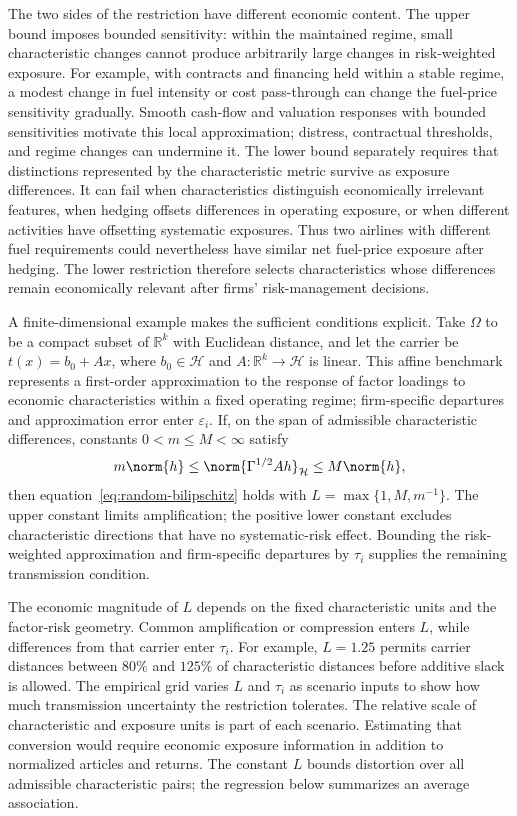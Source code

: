 The two sides of the restriction have different economic content.
The upper bound imposes bounded sensitivity: within the maintained regime,
small characteristic changes cannot produce arbitrarily large changes in
risk-weighted exposure.
For example, with contracts and financing held within a stable regime,
a modest change in fuel intensity or cost pass-through can change the
fuel-price sensitivity gradually.
Smooth cash-flow and valuation responses with bounded sensitivities motivate
this local approximation; distress, contractual thresholds, and regime
changes can undermine it.
The lower bound separately requires that distinctions represented by the
characteristic metric survive as exposure differences.
It can fail when characteristics distinguish economically irrelevant features,
when hedging offsets differences in operating exposure, or when different
activities have offsetting systematic exposures.
Thus two airlines with different fuel requirements could nevertheless have
similar net fuel-price exposure after hedging.
The lower restriction therefore selects characteristics whose differences
remain economically relevant after firms' risk-management decisions.

A finite-dimensional example makes the sufficient conditions explicit.
Take $\Omega$ to be a compact subset of $\mathbb R^k$ with Euclidean distance,
and let the carrier be $t(x)=b_0+Ax$, where $b_0\in\mathcal H$ and
$A:\mathbb R^k\to\mathcal H$ is linear.
This affine benchmark represents a first-order approximation to the response
of factor loadings to economic characteristics within a fixed operating regime;
firm-specific departures and approximation error enter $\varepsilon_i$.
If, on the span of admissible characteristic differences, constants
$0<m\le M<\infty$ satisfy
\[
  m\norm{h}\le\norm{\Gamma^{1/2}Ah}_{\mathcal H}\le M\norm{h},
\]
then equation~\ref{eq:random-bilipschitz} holds with
$L=\max\{1,M,m^{-1}\}$.
The upper constant limits amplification; the positive lower constant excludes
characteristic directions that have no systematic-risk effect.
Bounding the risk-weighted approximation and firm-specific departures by
$\tau_i$ supplies the remaining transmission condition.

The economic magnitude of $L$ depends on the fixed characteristic units and
the factor-risk geometry.
Common amplification or compression enters $L$, while differences from that
carrier enter $\tau_i$.
For example, $L=1.25$ permits carrier distances between $80\%$ and $125\%$
of characteristic distances before additive slack is allowed.
The empirical grid varies $L$ and $\tau_i$ as scenario inputs to show how
much transmission uncertainty the restriction tolerates.
The relative scale of characteristic and exposure units is part of each scenario.
Estimating that conversion would require economic exposure information in
addition to normalized articles and returns.
The constant $L$ bounds distortion over all admissible characteristic pairs;
the regression below summarizes an average association.

